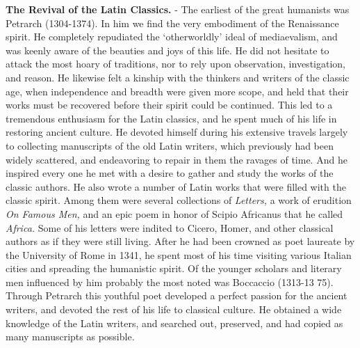 \documentclass[]{book}
\begin{document}
\textbf{The Revival of the Latin Classics.} - The earliest of the great humanists was Petrarch (1304-1374). In him we find the very embodiment of the Renaissance spirit. He completely repudiated the `otherworldly' ideal of mediaevalism, and was keenly aware of the beauties and joys of this life. He did not hesitate to attack the most hoary of traditions, nor to rely upon observation, investigation, and reason. He likewise felt a kinship with the thinkers and writers of the classic age, when independence and breadth were given more scope, and held that their works must be recovered before their spirit could be continued. This led to a tremendous enthusiasm for the Latin classics, and he spent much of his life in restoring ancient culture. He devoted himself during his extensive travels largely to collecting manuscripts of the old Latin writers, which previously had been widely scattered, and endeavoring to repair in them the ravages of time. And he inspired every one he met with a desire to gather and study the works of the classic authors. He also wrote a number of Latin works that were filled with the classic spirit. Among them were several collections of \emph{Letters,} a work of erudition \emph{On Famous Men,} and an epic poem in honor of Scipio Africanus that he called \emph{Africa.} Some of his letters were indited to Cicero, Homer, and other classical authors as if they were still living. After he had been crowned as poet laureate by the University of Rome in 1341, he spent most of his time visiting various Italian cities and spreading the humanistic spirit. Of the younger scholars and literary men influenced by him probably the most noted was Boccaccio (1313-13 75). Through Petrarch this youthful poet developed a perfect passion for the ancient writers, and devoted the rest of his life to classical culture. He obtained a wide knowledge of the Latin writers, and searched out, preserved, and had copied as many manuscripts as possible.
\end{document}

